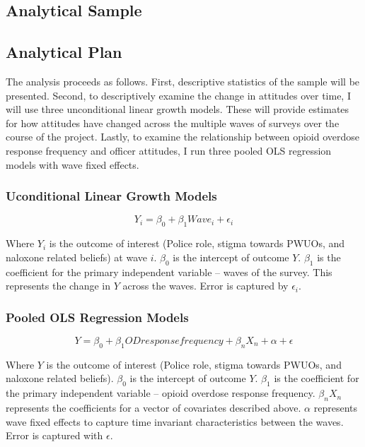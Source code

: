 \subsection{Analytical Sample}
\subsection{Analytical Plan}

The analysis proceeds as follows. First, descriptive statistics of the sample will be presented. Second, to descriptively examine the change in attitudes over time, I will use three unconditional linear growth models. These will provide estimates for how attitudes have changed across the multiple waves of surveys over the course of the project. Lastly, to examine the relationship between opioid overdose response frequency and officer attitudes, I run three pooled OLS regression models with wave fixed effects.

\subsubsection{Uconditional Linear Growth Models}

\[Y_i = \beta_0 + \beta_1 Wave_i + \epsilon_i \]

Where \(Y_i\) is the outcome of interest (Police role, stigma towards PWUOs, and naloxone related beliefs) at wave \(i\). \(\beta_0\) is the intercept of outcome \(Y\). \(\beta_1\) is the coefficient for the primary independent variable -- waves of the survey. This represents the change in \(Y\) across the waves. Error is captured by \(\epsilon_i\).

\subsubsection{Pooled OLS Regression Models}

\[Y = \beta_0 + \beta_1 OD response frequency + \beta_n X_n + \alpha + \epsilon \]

Where \(Y\) is the outcome of interest (Police role, stigma towards PWUOs, and naloxone related beliefs). \(\beta_0\) is the intercept of outcome \(Y\). \(\beta_1\) is the coefficient for the primary independent variable -- opioid overdose response frequency. \(\beta_n X_n\) represents the coefficients for a vector of covariates described above. \(\alpha\) represents wave fixed effects to capture time invariant characteristics between the waves. Error is captured with \(\epsilon\).


